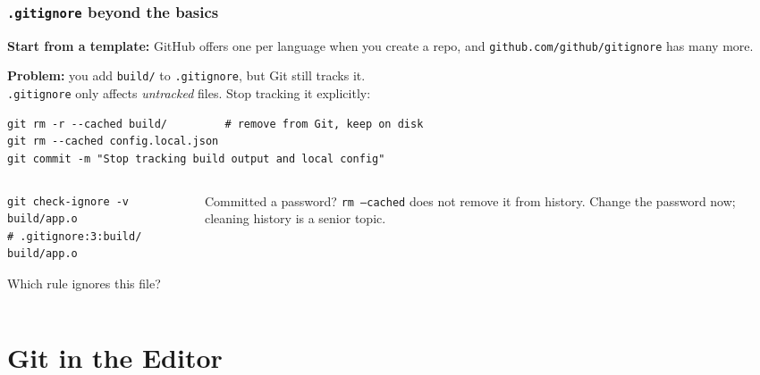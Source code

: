 \documentclass[aspectratio=169,10pt,compress]{beamer}
\newcommand{\cmd}[1]{\texttt{\color{gitred}#1}}
\begin{document}
\begin{frame}[t,fragile] \frametitle{\texttt{.gitignore} beyond the basics}
  \textbf{Start from a template:} GitHub offers one per language when you create a repo,
  and \texttt{github.com/github/gitignore} has many more.

  \vspace{0.5em}
  \textbf{Problem:} you add \texttt{build/} to \texttt{.gitignore}, but Git still tracks it.\\
  \texttt{.gitignore} only affects \emph{untracked} files. Stop tracking it explicitly:
\begin{lstlisting}
git rm -r --cached build/         # remove from Git, keep on disk
git rm --cached config.local.json
git commit -m "Stop tracking build output and local config"
\end{lstlisting}

  \begin{columns}[T]
    \begin{column}{0.48\textwidth}
\begin{lstlisting}
git check-ignore -v build/app.o
# .gitignore:3:build/   build/app.o
\end{lstlisting}
      \small Which rule ignores this file?
    \end{column}
    \begin{column}{0.48\textwidth}
      \begin{alertblock}{Committed a password?}
        \small \cmd{rm --cached} does not remove it from history.
        Change the password now; cleaning history is a senior topic.
      \end{alertblock}
    \end{column}
  \end{columns}
\end{frame}

\section[Editor]{Git in the Editor}
\end{document}
